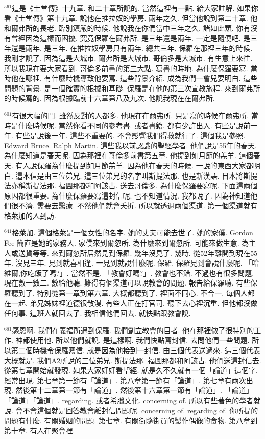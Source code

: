 \documentclass{book}
\begin{document}
$^{561}$這是《士堂傳》十九章.
和二十章所說的.
當然這裡有一點.
給大家註解.
如果你看《士堂傳》第十九章.
說他在推拉奴的學房.
兩年之久.
但當他說到第二十章.
他和爾弗所的長老.
臨別鎮嚴的時候.
他說我在你們當中三年之久.
諸如此類.
你有沒有曾經因為這樣而困擾.
究竟保羅在爾弗所.
是三年還是兩年.
一定是隨便吧.
是三年還是兩年.
是三年.
在推拉奴學房只有兩年.
總共三年.
保羅在那裡三年的時候.
我剛才說了.
因為這是大城市.
爾弗所是大城市.
哥倫多是大城市.
有生意上來往.
所以我現在要大家看到.
哥倫多前書的第三大點.
寫書的時地.
為什麼保羅要寫.
當時他在哪裡.
有什麼時機導致他要寫.
這些背景介紹.
成為我們一會兒要明白.
這些問題的背景.
是一個確實的根據和基礎.
保羅是在他的第三次宣教旅程.
來到爾弗所的時候寫的.
因為根據臨前十六章第八及九次.
他說我現在在爾弗所.

$^{601}$有很大幅的門.
雖然反對的人都多.
他現在在爾弗所.
只是寫的時候在爾弗所.
當時是什麼時候呢.
當然你看不同的參考書.
或者書籍.
都有少許出入.
有些是說前一年.
有些是說後一年.
這些不重要的.
不會影響我們得救就行了.
這個我是參照.
Edward Bruce.
Ralph Martin.
這些我以前認識的聖經學者.
他們說是55年的春天.
為什麼知道是春天呢.
因為那裡在哥倫多前書第五章.
他提到如月節的羔羊.
這個春天.
有人說保羅為什麼提到如月節羔羊.
因為他在春天的時候.
一說的東西大家都明白.
這本信是由三位弟兄.
這三位弟兄的名字叫斯提法那.
也是新漢語.
日本將斯提法亦稱斯提法那.
福圖那都和阿該古.
送去哥倫多.
為什麼保羅要寫呢.
下面這兩個原因都很重要.
為什麼保羅要寫這封信呢.
也不知道情況.
我都說了.
因為神知道他們很不濟.
需要去醫療.
不然他們就會夭折.
所以就透過兩個渠道.
第一個渠道就有格萊加的人到訪.

$^{641}$格萊加.
這個格萊是一個女性的名字.
她的丈夫可能去世了.
她的家僕.
Gordon Fee 簡直是她的家務人.
家僕來到爾忽所.
為什麼來到爾忽所.
可能來做生意.
為主人或送貨等等.
來到爾忽所居然見到保羅.
幾年沒見了.
幾時.
從52年離開到現在55年.
沒見三年.
見到就喜相逢.
一見到就說什麼呢.
保羅.
保羅見到會說什麼呢.
「哈維爾,你吃飯了嗎?」.
當然不是.
「教會好嗎?」.
教會也不錯.
不過也有很多問題.
現在數一數二.
數給他聽.
難得有個渠道可以說教會的問題.
報告給保羅聽.
有些保羅聽到了.
特別從第一章到第六章.
大概都聽到了.
裡面不同心.
不合一.
每個人都在一起.
弟兄姊妹裡道德很散漫.
有些人正在打官司.
聽下去心裡沉重.
但他都沒做任何事.
這班人就回去了.
我相信他們回去.
就快點跟教會說.

$^{681}$感恩啊.
我們在義福所遇到保羅.
我們創立教會的目者.
他在那裡做了很特別的工作.
神都使用他.
所以他們就說.
是這樣啊.
我們快點寫封信.
去問他們一些問題.
所以第二個時機令保羅寫信.
就是因為他接到一封信.
由三個代表送過來.
這三個代表大概就是.
我們A2所說的三位弟兄.
斯提法那.
福圖那都和阿該古.
他們送這封信去.
從第七章開始就發現.
如果大家好好看聖經.
就是久不久就有一個「論道」這個字.
經常出現.
第七章第一節有「論道」.
第八章第一節有「論道」.
第七章有兩次出現.
然後第十二章第一節有「論道」.
然後第十六章第一節有「論道」.
「論道」「論道」「論道」.
regarding.
或者希臘文化.
concerning of.
所以有些著色的學者就說.
會不會這個就是回答教會離封信問題呢.
concerning of.
regarding of.
你所提的問題有什麼.
有關婚姻的問題.
第七章.
有關街隨街買的製作偶像的食物.
第八章到第十章.
有人在聚會裡.
\end{document}
